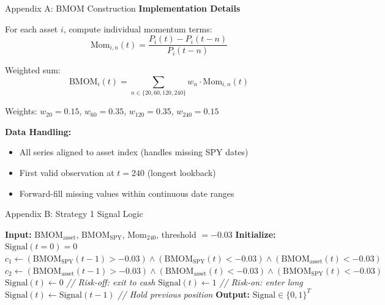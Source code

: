 \documentclass[aspectratio=169,10pt]{beamer}
\begin{document}
\begin{frame}{Appendix A: BMOM Construction}
\textbf{Implementation Details}

\vspace{0.3cm}

For each asset $i$, compute individual momentum terms:
$$\text{Mom}_{i,n}(t) = \frac{P_i(t) - P_i(t-n)}{P_i(t-n)}$$

\vspace{0.2cm}

Weighted sum:
$$\text{BMOM}_i(t) = \sum_{n \in \{20,60,120,240\}} w_n \cdot \text{Mom}_{i,n}(t)$$

\vspace{0.2cm}

Weights: $w_{20} = 0.15$, $w_{60} = 0.35$, $w_{120} = 0.35$, $w_{240} = 0.15$

\vspace{0.3cm}

\textbf{Data Handling:}
\begin{itemize}
    \item All series aligned to asset index (handles missing SPY dates)
    \item First valid observation at $t = 240$ (longest lookback)
    \item Forward-fill missing values within continuous date ranges
\end{itemize}
\end{frame}

\begin{frame}[fragile]{Appendix B: Strategy 1 Signal Logic}
\small
\begin{algorithmic}[1]
\STATE \textbf{Input:} $\text{BMOM}_{\text{asset}}$, $\text{BMOM}_{\text{SPY}}$, $\text{Mom}_{240}$, threshold $= -0.03$
\STATE \textbf{Initialize:} $\text{Signal}(t=0) = 0$
    \STATE $c_1 \leftarrow (\text{BMOM}_{\text{SPY}}(t-1) > -0.03) \land (\text{BMOM}_{\text{SPY}}(t) < -0.03) \land (\text{BMOM}_{\text{asset}}(t) < -0.03)$
    \STATE $c_2 \leftarrow (\text{BMOM}_{\text{asset}}(t-1) > -0.03) \land (\text{BMOM}_{\text{asset}}(t) < -0.03) \land (\text{BMOM}_{\text{SPY}}(t) < -0.03)$
        \STATE $\text{Signal}(t) \leftarrow 0$ \quad \textit{// Risk-off: exit to cash}
        \STATE $\text{Signal}(t) \leftarrow 1$ \quad \textit{// Risk-on: enter long}
    \ELSE
        \STATE $\text{Signal}(t) \leftarrow \text{Signal}(t-1)$ \quad \textit{// Hold previous position}
    \ENDIF
\ENDFOR
\STATE \textbf{Output:} $\text{Signal} \in \{0,1\}^T$
\end{algorithmic}
\end{frame}
\end{document}
